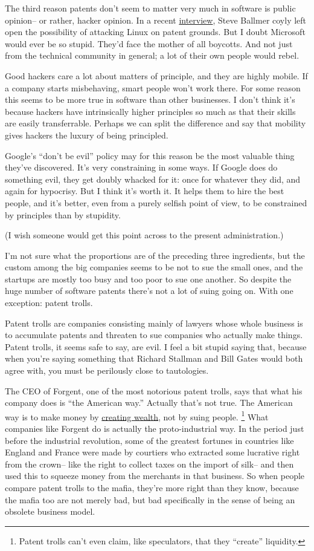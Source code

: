 \documentclass[12pt]{book}
\begin{document}
The third reason patents don't seem to matter very much in software is
public opinion-- or rather, hacker opinion. In a recent
\href{http://www.computing.co.uk/forbes/news/2152720/interview-steve-ballmer-linux}{interview},
Steve Ballmer coyly left open the possibility of attacking Linux on
patent grounds. But I doubt Microsoft would ever be so stupid. They'd
face the mother of all boycotts. And not just from the technical
community in general; a lot of their own people would rebel.

Good hackers care a lot about matters of principle, and they are highly
mobile. If a company starts misbehaving, smart people won't work there.
For some reason this seems to be more true in software than other
businesses. I don't think it's because hackers have intrinsically higher
principles so much as that their skills are easily transferrable.
Perhaps we can split the difference and say that mobility gives hackers
the luxury of being principled.

Google's ``don't be evil'' policy may for this reason be the most
valuable thing they've discovered. It's very constraining in some ways.
If Google does do something evil, they get doubly whacked for it: once
for whatever they did, and again for hypocrisy. But I think it's worth
it. It helps them to hire the best people, and it's better, even from a
purely selfish point of view, to be constrained by principles than by
stupidity.

(I wish someone would get this point across to the present
administration.)

I'm not sure what the proportions are of the preceding three
ingredients, but the custom among the big companies seems to be not to
sue the small ones, and the startups are mostly too busy and too poor to
sue one another. So despite the huge number of software patents there's
not a lot of suing going on. With one exception: patent trolls.

Patent trolls are companies consisting mainly of lawyers whose whole
business is to accumulate patents and threaten to sue companies who
actually make things. Patent trolls, it seems safe to say, are evil. I
feel a bit stupid saying that, because when you're saying something that
Richard Stallman and Bill Gates would both agree with, you must be
perilously close to tautologies.

The CEO of Forgent, one of the most notorious patent trolls, says that
what his company does is ``the American way.'' Actually that's not true.
The American way is to make money by \href{wealth.html}{creating
wealth}, not by suing people. \footnote{Patent trolls can't even claim, like speculators, that they
``create'' liquidity.} What companies
like Forgent do is actually the proto-industrial way. In the period just
before the industrial revolution, some of the greatest fortunes in
countries like England and France were made by courtiers who extracted
some lucrative right from the crown-- like the right to collect taxes on
the import of silk-- and then used this to squeeze money from the
merchants in that business. So when people compare patent trolls to the
mafia, they're more right than they know, because the mafia too are not
merely bad, but bad specifically in the sense of being an obsolete
business model.
\end{document}
